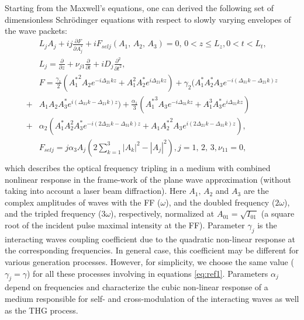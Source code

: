 \documentclass[a4paper, 12pt, onecolumn]{extarticle}
\begin{document}
Starting from the Maxwell's equations,  one can derived the following set of dimensionless Schr\"{o}dinger equations with respect to slowly varying envelopes of the wave packets: 
\begin{equation}
\label{eq:ref1}
\begin{aligned}
&L_jA_j+ij\frac{\partial F}{\partial A_j^*}+iF_{selj}(A_1,\,A_2,\,A_3)=0,\,0< z \leq L_z , 0<t<L_t,\\
&L_j=\frac{\partial}{\partial z}+\nu_{j1}\frac{\partial}{\partial t}+iD_j\frac{\partial^2}{\partial t^2},\\
&F=\frac{\gamma_1}{2}({A_1^*}^2A_2e^{-i\Delta_{21} kz}+A_1^2A_2^*e^{i\Delta_{21} kz})+\gamma_2 (A_1^*A_2^* A_3e^{-i(\Delta_{31}k-\Delta_{21}k)z}\\
+&A_1A_2A_3^*e^{i(\Delta_{31}k-\Delta_{21}k)z})+\frac{\alpha_1}{3}({A_1^*}^3 A_3 e^{-i\Delta_{31}kz}+A_1^3 A_3^* e^{i\Delta_{31}kz})\\
+&\alpha_2(A_1^*A_2^2 A_3^*e^{-i(2\Delta_{21}k-\Delta_{31}k )z}+A_1{A_2^*}^2 A_3e^{i(2\Delta_{21}k-\Delta_{31}k )z}),\\
&F_{selj}=j\alpha_3 A_j(2\sum\limits_{k=1}^3 |A_k|^2-|A_j|^2), j=1,\,2,\,3, \nu_{11}=0,\\
\end{aligned}
\end{equation}
which describes the optical frequency tripling in a medium with combined nonlinear response in the frame-work of the plane wave approximation (without taking into account a laser beam diffraction). 
Here \(A_1,\,A_2\) and \(A_3\) are the complex amplitudes of waves with the FF (\(\omega\)), and the doubled frequency (\(2\omega\)), and the tripled frequency (\(3\omega\)), respectively, normalized at \(A_{01}=\sqrt{I_{01}}\) (a square root of the incident pulse maximal intensity at the FF). Parameter \(\gamma_j\) is the interacting waves coupling coefficient  due to the quadratic non-linear response at the corresponding frequencies.  In general case, this coefficient may be different for various generation processes. However, for simplicity, we choose the same value (\(\gamma_j=\gamma\)) for all these processes involving in equations \eqref{eq:ref1}. Parameters \(\alpha_j\) depend on frequencies and characterize the cubic non-linear response of a medium responsible  for self-  and cross-modulation of the interacting waves as well as  the THG process. 
\end{document}
